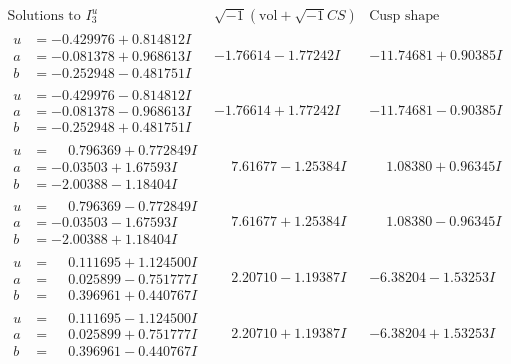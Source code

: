 \documentclass[1p]{elsarticle_modified}
\theoremstyle{definition}
\newcommand{\I}{\sqrt{-1}}
\begin{document}
$$\begin{array}{c|c|c}  
\text{Solutions to }I^u_{3}& \I (\text{vol} + \sqrt{-1}CS) & \text{Cusp shape}\\
 \hline 
\begin{aligned}
u &= -0.429976 + 0.814812 I \\
a &= -0.081378 + 0.968613 I \\
b &= -0.252948 - 0.481751 I\end{aligned}
 & -1.76614 - 1.77242 I & -11.74681 + 0.90385 I \\ \hline\begin{aligned}
u &= -0.429976 - 0.814812 I \\
a &= -0.081378 - 0.968613 I \\
b &= -0.252948 + 0.481751 I\end{aligned}
 & -1.76614 + 1.77242 I & -11.74681 - 0.90385 I \\ \hline\begin{aligned}
u &= \phantom{-}0.796369 + 0.772849 I \\
a &= -0.03503 + 1.67593 I \\
b &= -2.00388 - 1.18404 I\end{aligned}
 & \phantom{-}7.61677 - 1.25384 I & \phantom{-}1.08380 + 0.96345 I \\ \hline\begin{aligned}
u &= \phantom{-}0.796369 - 0.772849 I \\
a &= -0.03503 - 1.67593 I \\
b &= -2.00388 + 1.18404 I\end{aligned}
 & \phantom{-}7.61677 + 1.25384 I & \phantom{-}1.08380 - 0.96345 I \\ \hline\begin{aligned}
u &= \phantom{-}0.111695 + 1.124500 I \\
a &= \phantom{-}0.025899 - 0.751777 I \\
b &= \phantom{-}0.396961 + 0.440767 I\end{aligned}
 & \phantom{-}2.20710 - 1.19387 I & -6.38204 - 1.53253 I \\ \hline\begin{aligned}
u &= \phantom{-}0.111695 - 1.124500 I \\
a &= \phantom{-}0.025899 + 0.751777 I \\
b &= \phantom{-}0.396961 - 0.440767 I\end{aligned}
 & \phantom{-}2.20710 + 1.19387 I & -6.38204 + 1.53253 I \\ \hline\begin{aligned}

\end{aligned}
\end{array}$$
\end{document}
